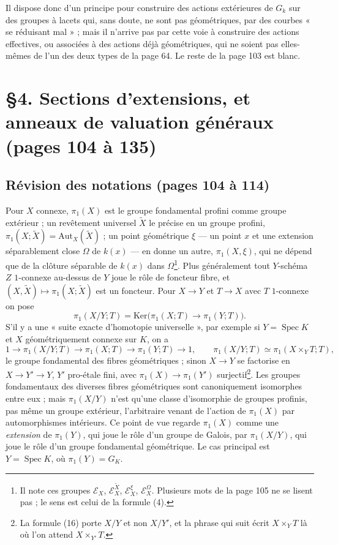 \documentclass[11pt,a4paper]{article}
\begin{document}
Il dispose donc d'un principe pour construire des actions extérieures de
$G_k$ sur des groupes à lacets qui, sans doute, ne sont pas géométriques, par
des courbes « se réduisant mal » ; mais il n'arrive pas par cette voie à
construire des actions effectives, ou associées à des actions déjà
géométriques, qui ne soient pas elles-mêmes de l'un des deux types de la page
64. Le reste de la page 103 est blanc.

\section*{§4. Sections d'extensions, et anneaux de valuation généraux (pages 104 à 135)}

\subsection*{Révision des notations (pages 104 à 114)}

Pour $X$ connexe, $\pi_1(X)$ est le groupe fondamental profini comme groupe
extérieur ; un revêtement universel $\widetilde{X}$ le précise en un groupe
profini, $\pi_1(X; \widetilde{X}) = \mathrm{Aut}_X(\widetilde{X})$ ; un point
géométrique $\xi$ — un point $x$ et une extension séparablement close $\Omega$
de $k(x)$ — en donne un autre, $\pi_1(X, \xi)$, qui ne dépend que de la clôture
séparable de $k(x)$ dans $\Omega$\footnote{Il note ces groupes
$\mathcal{E}_X$, $\mathcal{E}_X^{\tilde X}$, $\mathcal{E}_X^{\xi}$,
$\mathcal{E}_X^{\Omega}$. Plusieurs mots de la page 105 ne se lisent pas ; le
sens est celui de la formule (4).}. Plus généralement tout $Y$-schéma $Z$
$1$-connexe au-dessus de $Y$ joue le rôle de foncteur fibre, et $(X,
\widetilde{X}) \mapsto \pi_1(X; \widetilde{X})$ est un foncteur. Pour $X \to Y$
et $T \to X$ avec $T$ $1$-connexe on pose
\[
\pi_1(X/Y; T) = \mathrm{Ker}\bigl(\pi_1(X; T) \to \pi_1(Y; T)\bigr) .
\]
S'il y a une « suite exacte d'homotopie universelle », par exemple si $Y =
\operatorname{Spec} K$ et $X$ géométriquement connexe sur $K$, on a
\[
1 \longrightarrow \pi_1(X/Y; T) \longrightarrow \pi_1(X; T) \longrightarrow
\pi_1(Y; T) \longrightarrow 1, \qquad \pi_1(X/Y; T) \simeq \pi_1(X \times_Y T;
T),
\]
le groupe fondamental des fibres géométriques ; sinon $X \to Y$ se factorise en
$X \to Y' \to Y$, $Y'$ pro-étale fini, avec $\pi_1(X) \to \pi_1(Y')$
surjectif\footnote{La formule (16) porte $X/Y$ et non $X/Y'$, et la phrase qui
suit écrit $X \times_Y T$ là où l'on attend $X \times_{Y'} T$.}. Les groupes
fondamentaux des diverses fibres géométriques sont canoniquement isomorphes
entre eux ; mais $\pi_1(X/Y)$ n'est qu'une classe d'isomorphie de groupes
profinis, pas même un groupe extérieur, l'arbitraire venant de l'action de
$\pi_1(X)$ par automorphismes intérieurs. Ce point de vue regarde $\pi_1(X)$
comme une \emph{extension} de $\pi_1(Y)$, qui joue le rôle d'un groupe de
Galois, par $\pi_1(X/Y)$, qui joue le rôle d'un groupe fondamental
géométrique. Le cas principal est $Y = \operatorname{Spec} K$, où $\pi_1(Y) =
G_K$.
\end{document}
